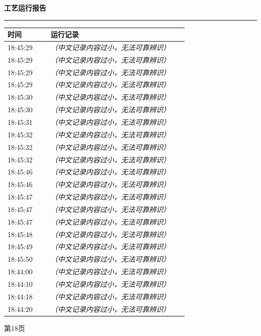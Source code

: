 \documentclass[UTF8,10pt,a4paper,fontset=fandol]{ctexart}
\begin{document}
\begin{minipage}[t]{0.47\linewidth}
\centering
\textbf{工艺运行报告}\\[-2pt]
\rule{\linewidth}{0.4pt}

\scriptsize
\begin{tabular}{|p{0.22\linewidth}|p{0.70\linewidth}|}
\hline
时间 & 运行记录 \\ \hline
18:45:29 & \textit{（中文记录内容过小，无法可靠辨识）} \\ \hline
18:45:29 & \textit{（中文记录内容过小，无法可靠辨识）} \\ \hline
18:45:29 & \textit{（中文记录内容过小，无法可靠辨识）} \\ \hline
18:45:29 & \textit{（中文记录内容过小，无法可靠辨识）} \\ \hline
18:45:30 & \textit{（中文记录内容过小，无法可靠辨识）} \\ \hline
18:45:30 & \textit{（中文记录内容过小，无法可靠辨识）} \\ \hline
18:45:31 & \textit{（中文记录内容过小，无法可靠辨识）} \\ \hline
18:45:32 & \textit{（中文记录内容过小，无法可靠辨识）} \\ \hline
18:45:32 & \textit{（中文记录内容过小，无法可靠辨识）} \\ \hline
18:45:32 & \textit{（中文记录内容过小，无法可靠辨识）} \\ \hline
18:45:46 & \textit{（中文记录内容过小，无法可靠辨识）} \\ \hline
18:45:46 & \textit{（中文记录内容过小，无法可靠辨识）} \\ \hline
18:45:47 & \textit{（中文记录内容过小，无法可靠辨识）} \\ \hline
18:45:47 & \textit{（中文记录内容过小，无法可靠辨识）} \\ \hline
18:45:47 & \textit{（中文记录内容过小，无法可靠辨识）} \\ \hline
18:45:48 & \textit{（中文记录内容过小，无法可靠辨识）} \\ \hline
18:45:49 & \textit{（中文记录内容过小，无法可靠辨识）} \\ \hline
18:45:50 & \textit{（中文记录内容过小，无法可靠辨识）} \\ \hline
18:44:00 & \textit{（中文记录内容过小，无法可靠辨识）} \\ \hline
18:44:10 & \textit{（中文记录内容过小，无法可靠辨识）} \\ \hline
18:44:18 & \textit{（中文记录内容过小，无法可靠辨识）} \\ \hline
18:44:20 & \textit{（中文记录内容过小，无法可靠辨识）} \\ \hline
\end{tabular}

\smallskip
第18页
\end{minipage}
\end{document}

